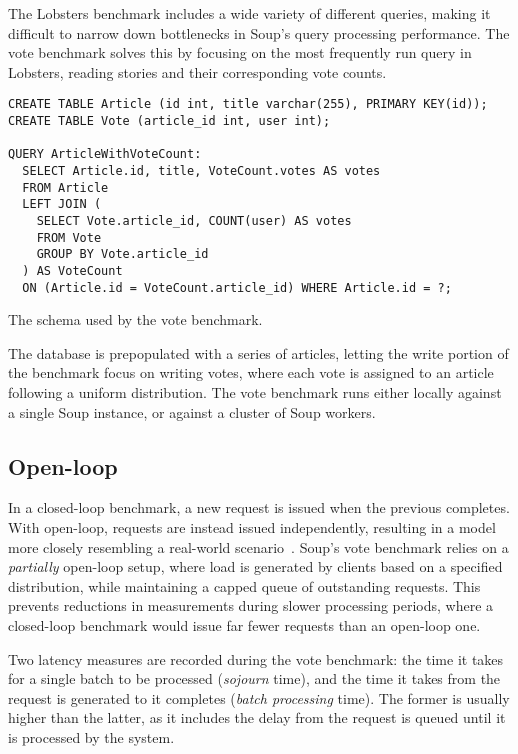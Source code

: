The Lobsters benchmark includes a wide variety of different queries, making it
difficult to narrow down bottlenecks in Soup's query processing performance. The
vote benchmark solves this by focusing on the most frequently run query in
Lobsters, reading stories and their corresponding vote counts.

\begin{listing}[H]
  \begin{verbatim}
CREATE TABLE Article (id int, title varchar(255), PRIMARY KEY(id));
CREATE TABLE Vote (article_id int, user int);

QUERY ArticleWithVoteCount:
  SELECT Article.id, title, VoteCount.votes AS votes
  FROM Article
  LEFT JOIN (
    SELECT Vote.article_id, COUNT(user) AS votes
    FROM Vote
    GROUP BY Vote.article_id
  ) AS VoteCount
  ON (Article.id = VoteCount.article_id) WHERE Article.id = ?;
  \end{verbatim}

  \caption{The schema used by the vote benchmark.}\label{lst:vote}
\end{listing}

The database is prepopulated with a series of articles, letting the write
portion of the benchmark focus on writing votes, where each vote is assigned to
an article following a uniform distribution. The vote benchmark runs either
locally against a single Soup instance, or against a cluster of Soup workers.


\subsection{Open-loop}\label{sec:vote-open-loop}

In a closed-loop benchmark, a new request is issued when the previous completes.
With open-loop, requests are instead issued independently, resulting in a model
more closely resembling a real-world scenario~\cite{open-loop}. Soup's vote
benchmark relies on a \textit{partially} open-loop setup, where load is
generated by clients based on a specified distribution, while maintaining a
capped queue of outstanding requests. This prevents reductions in measurements
during slower processing periods, where a closed-loop benchmark would issue far
fewer requests than an open-loop one.

Two latency measures are recorded during the vote benchmark: the time it takes
for a single batch to be processed (\textit{sojourn} time), and the time it
takes from the request is generated to it completes (\textit{batch processing}
time). The former is usually higher than the latter, as it includes the delay
from the request is queued until it is processed by the system.

